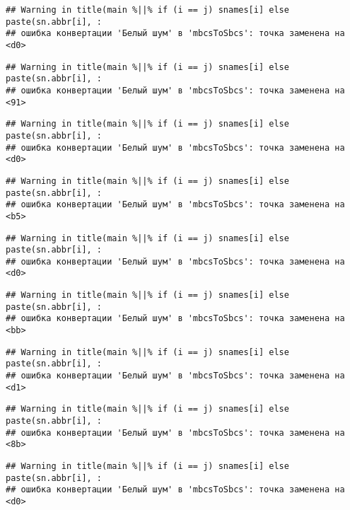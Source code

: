 \documentclass[
]{article}
\begin{document}
\begin{verbatim}
## Warning in title(main %||% if (i == j) snames[i] else paste(sn.abbr[i], :
## ошибка конвертации 'Белый шум' в 'mbcsToSbcs': точка заменена на <d0>
\end{verbatim}

\begin{verbatim}
## Warning in title(main %||% if (i == j) snames[i] else paste(sn.abbr[i], :
## ошибка конвертации 'Белый шум' в 'mbcsToSbcs': точка заменена на <91>
\end{verbatim}

\begin{verbatim}
## Warning in title(main %||% if (i == j) snames[i] else paste(sn.abbr[i], :
## ошибка конвертации 'Белый шум' в 'mbcsToSbcs': точка заменена на <d0>
\end{verbatim}

\begin{verbatim}
## Warning in title(main %||% if (i == j) snames[i] else paste(sn.abbr[i], :
## ошибка конвертации 'Белый шум' в 'mbcsToSbcs': точка заменена на <b5>
\end{verbatim}

\begin{verbatim}
## Warning in title(main %||% if (i == j) snames[i] else paste(sn.abbr[i], :
## ошибка конвертации 'Белый шум' в 'mbcsToSbcs': точка заменена на <d0>
\end{verbatim}

\begin{verbatim}
## Warning in title(main %||% if (i == j) snames[i] else paste(sn.abbr[i], :
## ошибка конвертации 'Белый шум' в 'mbcsToSbcs': точка заменена на <bb>
\end{verbatim}

\begin{verbatim}
## Warning in title(main %||% if (i == j) snames[i] else paste(sn.abbr[i], :
## ошибка конвертации 'Белый шум' в 'mbcsToSbcs': точка заменена на <d1>
\end{verbatim}

\begin{verbatim}
## Warning in title(main %||% if (i == j) snames[i] else paste(sn.abbr[i], :
## ошибка конвертации 'Белый шум' в 'mbcsToSbcs': точка заменена на <8b>
\end{verbatim}

\begin{verbatim}
## Warning in title(main %||% if (i == j) snames[i] else paste(sn.abbr[i], :
## ошибка конвертации 'Белый шум' в 'mbcsToSbcs': точка заменена на <d0>
\end{verbatim}
\end{document}
